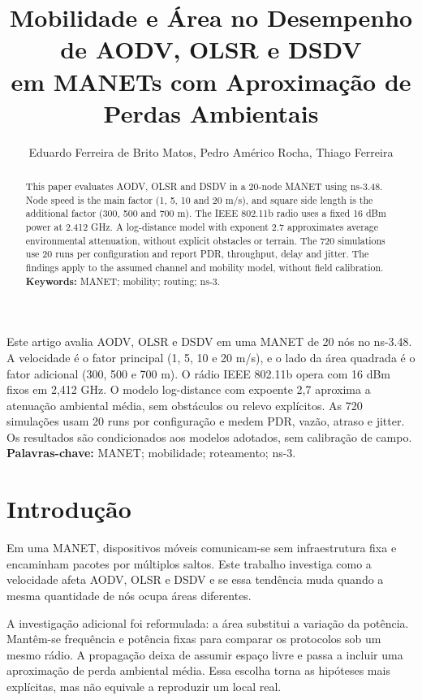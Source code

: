 \documentclass[12pt]{article}
\title{Mobilidade e Área no Desempenho de AODV, OLSR e DSDV\\
em MANETs com Aproximação de Perdas Ambientais}
\author{Eduardo Ferreira de Brito Matos\inst{1}, Pedro Américo Rocha\inst{1},
  Thiago Ferreira\inst{1}}
\begin{document}
\maketitle

\begin{abstract}
This paper evaluates AODV, OLSR and DSDV in a 20-node MANET using ns-3.48.
Node speed is the main factor (1, 5, 10 and 20 m/s), and square side length
is the additional factor (300, 500 and 700 m). The IEEE 802.11b radio uses a
fixed 16 dBm power at 2.412 GHz. A log-distance model with exponent 2.7
approximates average environmental attenuation, without explicit obstacles
or terrain. The 720 simulations use 20 runs per configuration and report PDR,
throughput, delay and jitter. \ResultAbstract{}
The findings apply to the assumed channel and mobility model, without field calibration.
\textbf{Keywords:} MANET; mobility; routing; ns-3.
\end{abstract}

\begin{resumo}
Este artigo avalia AODV, OLSR e DSDV em uma MANET de 20 nós no ns-3.48.
A velocidade é o fator principal (1, 5, 10 e 20 m/s), e o lado da área
quadrada é o fator adicional (300, 500 e 700 m). O rádio IEEE 802.11b opera
com 16 dBm fixos em 2,412 GHz. O modelo log-distance com expoente 2,7
aproxima a atenuação ambiental média, sem obstáculos ou relevo explícitos.
As 720 simulações usam 20 runs por configuração e medem PDR, vazão, atraso
e jitter. \ResultResumo{}
Os resultados são condicionados aos modelos adotados, sem calibração de campo.
\textbf{Palavras-chave:} MANET; mobilidade; roteamento; ns-3.
\end{resumo}

\section{Introdução}
Em uma MANET, dispositivos móveis comunicam-se sem infraestrutura fixa
e encaminham pacotes por múltiplos saltos. Este trabalho investiga como
a velocidade afeta AODV, OLSR e DSDV e se essa tendência muda quando a mesma
quantidade de nós ocupa áreas diferentes.

A investigação adicional foi reformulada: a área substitui a variação da
potência. Mantêm-se frequência e potência fixas para comparar os protocolos
sob um mesmo rádio. A propagação deixa de assumir espaço livre e passa a
incluir uma aproximação de perda ambiental média. Essa escolha torna as
hipóteses mais explícitas, mas não equivale a reproduzir um local real.
\end{document}
